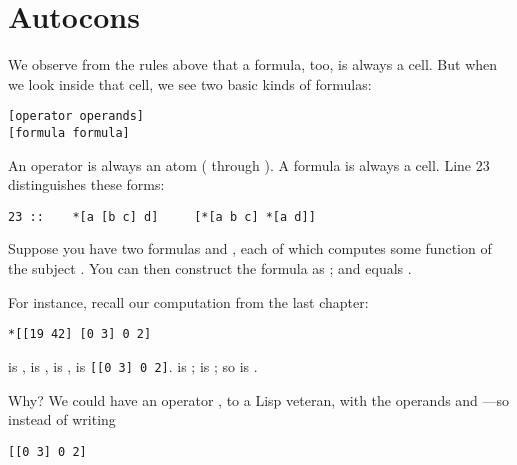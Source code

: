 \section{Autocons}

We observe from the rules above that a formula, too, is always a
cell.  But when we look inside that cell, we see two basic kinds
of formulas:

\begin{framed_shaded}
\begin{Verbatim}[fontsize=\relsize{-2.5},fontseries=b,commandchars=\\\{\}]
[operator operands]
[formula formula]
\end{Verbatim}
\end{framed_shaded}

An operator is always an atom ( through ).  A formula is
always a cell.  Line 23 distinguishes these forms:

\begin{framed_shaded}
\begin{Verbatim}[fontsize=\relsize{-2.5},fontseries=b,commandchars=\\\{\}]
23 ::    *[a [b c] d]     [*[a b c] *[a d]]
\end{Verbatim}
\end{framed_shaded}

Suppose you have two formulas  and , each of which computes
some function of the subject .  You can then construct the
formula  as \kode{[f g]}; and  equals \kode{[f(s) g(s)]}.

For instance, recall our computation from the last chapter:

\begin{framed_shaded}
\begin{Verbatim}[fontsize=\relsize{-2.5},fontseries=b,commandchars=\\\{\}]
*[[19 42] [0 3] 0 2]
\end{Verbatim}
\end{framed_shaded}

 is \kode{[19 42]},  is \kode{[0 3]},  is \kode{[0 2]},  is {\tt [[0 3] 0
2]}.   is ;  is ; so  is \kode{[42 19]}.

Why?  We could have an operator ,  to a Lisp veteran,
with the operands  and ---so instead of writing

\begin{framed_shaded}
\begin{Verbatim}[fontsize=\relsize{-2.5},fontseries=b,commandchars=\\\{\}]
[[0 3] 0 2]
\end{Verbatim}
\end{framed_shaded}

